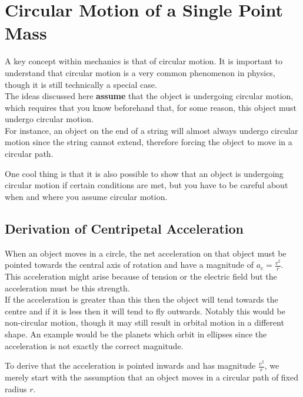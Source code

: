 \documentclass[main.tex]{subfiles}
\begin{document}
            \newpage

        \section{Circular Motion of a Single Point Mass}
            \label{sec: Circular Motion}

            A key concept within mechanics is that of circular motion. It is important to understand that circular motion is a very common phenomenon in physics, though it is still technically a special case.\\
            The ideas discussed here \textbf{assume} that the object is undergoing circular motion, which requires that you know beforehand that, for some reason, this object must undergo circular motion.\\
            For instance, an object on the end of a string will almost always undergo circular motion since the string cannot extend, therefore forcing the object to move in a circular path.

            One cool thing is that it is also possible to show that an object is undergoing circular motion if certain conditions are met, but you have to be careful about when and where you assume circular motion.

            \subsection{Derivation of Centripetal Acceleration}
                \label{subsec: Derivation of Centripetal Acceleration}

                When an object moves in a circle, the net acceleration on that object must be pointed towards the central axis of rotation and have a magnitude of $a_c = \frac{v^2}{r}$.\\
                This acceleration might arise because of tension or the electric field but the acceleration must be this strength.\\
                If the acceleration is greater than this then the object will tend towards the centre and if it is less then it will tend to fly outwards. Notably this would be non-circular motion, though it may still result in orbital motion in a different shape. An example would be the planets which orbit in ellipses since the acceleration is not exactly the correct magnitude.

                To derive that the acceleration is pointed inwards and has magnitude $\frac{v^2}{r}$, we merely start with the assumption that an object moves in a circular path of fixed radius $r$.
\end{document}
